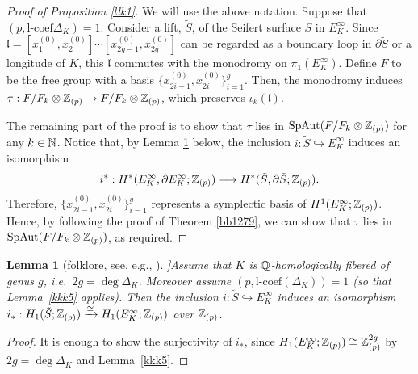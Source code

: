 \documentclass{article}
\theoremstyle{plain}
\newtheorem{lem}[thm]{Lemma}
\theoremstyle{definition}
\newcommand{\lra}{\longrightarrow}
\newcommand{\ra}{\rightarrow}
\newcommand{\N}{{\Bbb N}}
\newcommand{\Q}{{\Bbb Q}}
\newcommand{\Z}{{\Bbb Z}}
\newcommand{\lc}{{\mathrm{l}\textrm{-}\mathrm{coef}}}
\begin{document}
{\begin{proof}
[Proof of Proposition \ref{llk1}] We will use the above notation. Suppose that $(p, \lc \Delta_K )=1.$ Consider a lift, $\tilde{S}$, of the Seifert surface $S$ in $E_{K}^{\infty}$. Since $\mathfrak{l} = [x_1^{(0)}, x_2^{(0)}] \cdots [x_{2g-1}^{(0)} , x_{2g}^{(0)}] $ can be regarded as a boundary loop in $\partial \tilde{S} $ or a longitude of $K$, this $\mathfrak{l}$ commutes with the monodromy on $\pi_1( E_{K}^{\infty} )$. Define $F$ to be the free group with a basis $\{ x_{2i-1}^{(0)}, x_{2i}^{(0)} \}_{i=1}^g $. Then, the monodromy induces $\tau: F / F_k \otimes \Z_{(p)} \ra F / F_k \otimes \Z_{(p)}$, which preserves $ \iota_k( \mathfrak{l} )$.

The remaining part of the proof is to show that $\tau$ lies in $\mathrm{SpAut}(F / F_k \otimes \Z_{(p)} )$ for any $k \in \N$. Notice that, by Lemma \ref{pp5} below, the inclusion $i: \tilde{S} \hookrightarrow E_{K}^{\infty}$ induces an isomorphism
\[ i^* :H^*(E_{K}^{\infty}, \partial E_{K}^{\infty} ;\Z_{(p)} ) \lra H^*(\tilde{S}, \partial \tilde{S} ;\Z_{(p)} ). \]
Therefore, $\{ x_{2i-1}^{(0)}, x_{2i}^{(0)} \}_{i=1}^g $ represents a symplectic basis of $H^1(E_{K}^{\infty};\Z_{(p)} )$. Hence, by following the proof of Theorem \ref{bb1279}, we can show that $\tau$ lies in $\mathrm{SpAut}(F / F_k \otimes \Z_{(p)} )$, as required.
\end{proof}

\begin{lem}[{folklore, see, e.g., \cite{GK}}]]\label{pp5}
Assume that $K$ is $\Q$-homologically fibered of genus $g$, i.e.\ $2g=\deg\Delta_K$.
Moreover assume $(p,\lc(\Delta_K))=1$ (so that Lemma~\ref{kkk5} applies).
Then the inclusion $i:\tilde S\hookrightarrow E_K^\infty$ induces an isomorphism$
i_*:H_1(\tilde S;\Z_{(p)}) \xrightarrow{\cong} H_1(E_K^\infty;\Z_{(p)})$ over $ \Z_{(p)}$.
\end{lem}


\begin{proof}
It is enough to show the surjectivity of $i_*$, since
$H_1(E_K^\infty;\Z_{(p)})\cong \Z_{(p)}^{2g}$ by $2g=\deg\Delta_K$ and Lemma~\ref{kkk5}.


\end{proof}}
\end{document}
